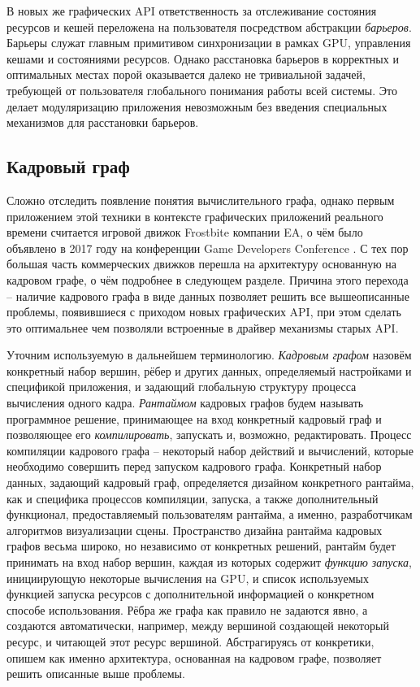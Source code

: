 В новых же графических API ответственность за отслеживание состояния ресурсов и кешей переложена на пользователя посредством абстракции \textit{барьеров}. Барьеры служат главным примитивом синхронизации в рамках GPU, управления кешами и состояниями ресурсов. Однако расстановка барьеров в корректных и оптимальных местах порой оказывается далеко не тривиальной задачей, требующей от пользователя глобального понимания работы всей системы. Это делает модуляризацию приложения невозможным без введения специальных механизмов для расстановки барьеров.

\subsection{Кадровый граф}
Сложно отследить появление понятия вычислительного графа, однако первым приложением этой техники в контексте графических приложений реального времени считается игровой движок Frostbite компании EA, о чём было объявлено в 2017 году на конференции Game Developers Conference \cite{FrostbiteGdcTalk}.
С тех пор большая часть коммерческих движков перешла на архитектуру основанную на кадровом графе, о чём подробнее в следующем разделе.
Причина этого перехода -- наличие кадрового графа в виде данных позволяет решить все вышеописанные проблемы, появившиеся с приходом новых графических API, при этом сделать это оптимальнее чем позволяли встроенные в драйвер механизмы старых API.

Уточним используемую в дальнейшем терминологию.
\textit{Кадровым графом} назовём конкретный набор вершин, рёбер и других данных, определяемый настройками и спецификой приложения, и задающий глобальную структуру процесса вычисления одного кадра.
\textit{Рантаймом} кадровых графов будем называть программное решение, принимающее на вход конкретный кадровый граф и позволяющее его \textit{компилировать}, запускать и, возможно, редактировать.
Процесс компиляции кадрового графа -- некоторый набор действий и вычислений, которые необходимо совершить перед запуском кадрового графа.
Конкретный набор данных, задающий кадровый граф, определяется дизайном конкретного рантайма, как и специфика процессов компиляции, запуска, а также дополнительный функционал, предоставляемый пользователям рантайма, а именно, разработчикам алгоритмов визуализации сцены.
Пространство дизайна рантайма кадровых графов весьма широко, но независимо от конкретных решений, рантайм будет принимать на вход набор вершин, каждая из которых содержит \textit{функцию запуска}, инициирующую некоторые вычисления на GPU, и список используемых функцией запуска ресурсов с дополнительной информацией о конкретном способе использования.
Рёбра же графа как правило не задаются явно, а создаются автоматически, например, между вершиной создающей некоторый ресурс, и читающей этот ресурс вершиной.
Абстрагируясь от конкретики, опишем как именно архитектура, основанная на кадровом графе, позволяет решить описанные выше проблемы.

